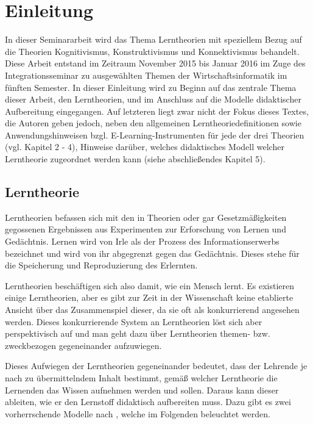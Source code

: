 \chapter{Einleitung}
\label{cha:Einleitung}
In dieser Seminararbeit wird das Thema Lerntheorien mit speziellem Bezug auf die Theorien Kognitivismus, Konstruktivismus und Konnektivismus behandelt. Diese Arbeit entstand im Zeitraum November 2015 bis Januar 2016 im Zuge des Integrationsseminar zu ausgewählten Themen der Wirtschaftsinformatik im fünften Semester. In dieser Einleitung wird zu Beginn auf das zentrale Thema dieser Arbeit, den Lerntheorien, und im Anschluss auf die Modelle didaktischer Aufbereitung eingegangen. Auf letzteren liegt zwar nicht der Fokus dieses Textes, die Autoren geben jedoch, neben den allgemeinen Lerntheoriedefinitionen sowie Anwendungshinweisen bzgl. E-Learning-Instrumenten für jede der drei Theorien (vgl. Kapitel 2 - 4), Hinweise darüber, welches didaktisches Modell welcher Lerntheorie zugeordnet werden kann (siehe abschließendes Kapitel 5). 

\section{Lerntheorie}
\label{sec:Lerntheorie}
Lerntheorien befassen sich mit den in Theorien oder gar Gesetzmäßigkeiten gegossenen Ergebnissen aus Experimenten zur Erforschung von Lernen und Gedächtnis. Lernen wird von Irle als der Prozess des Informationserwerbs bezeichnet und wird von ihr abgegrenzt gegen das Gedächtnis. Dieses stehe für die Speicherung und Reproduzierung des Erlernten. \cite[]{Irle.1986}

Lerntheorien beschäftigen sich also damit, wie ein Mensch lernt. \cite{Reinmann.2013} Es existieren einige Lerntheorien, aber es gibt zur Zeit in der Wissenschaft keine etablierte Ansicht über das Zusammenspiel dieser, da sie oft als konkurrierend angesehen werden. \cite[S. 172 - 173]{Weinert.1996} Dieses konkurrierende System an Lerntheorien löst sich aber perspektivisch auf \cite{WittKerres.2002} und man geht dazu über Lerntheorien themen- bzw. zweckbezogen gegeneinander aufzuwiegen. \cite{Reinmann.2013}

Dieses Aufwiegen der Lerntheorien gegeneinander bedeutet, dass der Lehrende je nach zu übermittelndem Inhalt bestimmt, gemäß welcher Lerntheorie die Lernenden das Wissen aufnehmen werden und sollen. Daraus kann dieser ableiten, wie er den Lernstoff didaktisch aufbereiten muss. Dazu gibt es zwei vorherrschende Modelle nach \cite{Kerres.2001}, welche im Folgenden beleuchtet werden. 

